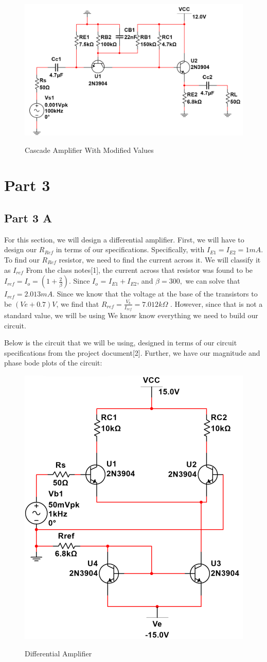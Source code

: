 \documentclass[12pt]{article}
\begin{document}
\begin{figure}[h!]
\centering
\includegraphics[height=0.3\textwidth]{Images/part_c_circuit.png}\\
\caption{Cascade Amplifier With Modified Values}
\label{fig:cascadeamp} 
\end{figure}




\section{Part 3}
\subsection{Part 3 A}
For this section, we will design a differential amplifier. First, we will have to design our $R_{Ref}$ in terms of our specifications. Specifically, with $I_{E1} = I_{E2} = 1mA. $ 
To find our $R_{Ref}$ resistor, we need to find the current across it. We will classify it as $I_{ref}$ From the class notes[1], the current across that resistor was found to be $I_{ref} = I_o =(1+\frac{2}{\beta})$. Since $I_o$ = $I_{E1}+I_{E2}$, and $\beta =300,$ we can solve that $I_{ref} = 2.013mA$. Since we know that the voltage at the base of the transistors to be $(Ve +0.7)V$, we find that $R_{ref} = \frac{V_b}{I_{ref}}=7.012k\Omega$ . However, since that is not a standard value, we will be using  We know know everything we need to build our circuit.

Below is the circuit that we will be using, designed in terms of our circuit specifications from the project document[2]. Further, we have our magnitude and phase bode plots of the circuit:


\begin{figure}[h!]
\centering
\includegraphics[height=0.3\textwidth]{Images/part_3_circuit.png}\\
\caption{Differential Amplifier }
\label{fig:diffamp}
\end{figure}
\end{document}
